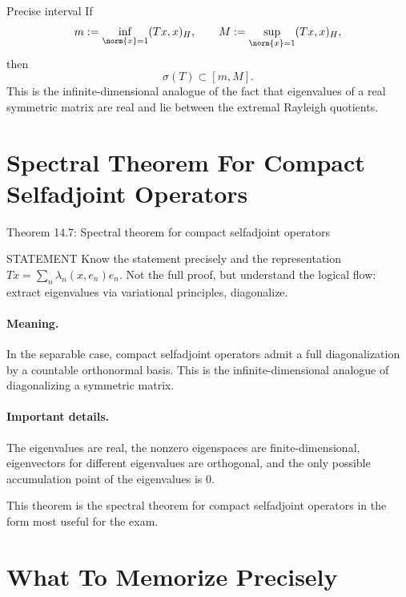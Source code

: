 \documentclass[header={Lecture 11 Exam Study Notes}]{study-note}
\begin{document}
\begin{exbox}{Precise interval}
If
\[
m:=\inf_{\norm{x}=1}(Tx,x)_H,
\qquad
M:=\sup_{\norm{x}=1}(Tx,x)_H,
\]
then
\[
\sigma(T)\subset [m,M].
\]
This is the infinite-dimensional analogue of the fact that eigenvalues of a real symmetric matrix are real and lie between the extremal Rayleigh quotients.
\end{exbox}

\section{Spectral Theorem For Compact Selfadjoint Operators}

\begin{thmbox}{Theorem 14.7: Spectral theorem for compact selfadjoint operators}
\thmHilbertSchmidt
\end{thmbox}

\begin{prooflevelbox}{STATEMENT}
Know the statement precisely and the representation $Tx=\sum_n\lambda_n(x,e_n)e_n$. Not the full proof, but understand the logical flow: extract eigenvalues via variational principles, diagonalize.
\end{prooflevelbox}

\paragraph{Meaning.}
In the separable case, compact selfadjoint operators admit a full diagonalization by a countable orthonormal basis. This is the infinite-dimensional analogue of diagonalizing a symmetric matrix.

\paragraph{Important details.}
The eigenvalues are real, the nonzero eigenspaces are finite-dimensional, eigenvectors for different eigenvalues are orthogonal, and the only possible accumulation point of the eigenvalues is $0$.

\begin{focusbox}
This theorem is the spectral theorem for compact selfadjoint operators in the form most useful for the exam.
\end{focusbox}

\section{What To Memorize Precisely}
\end{document}
